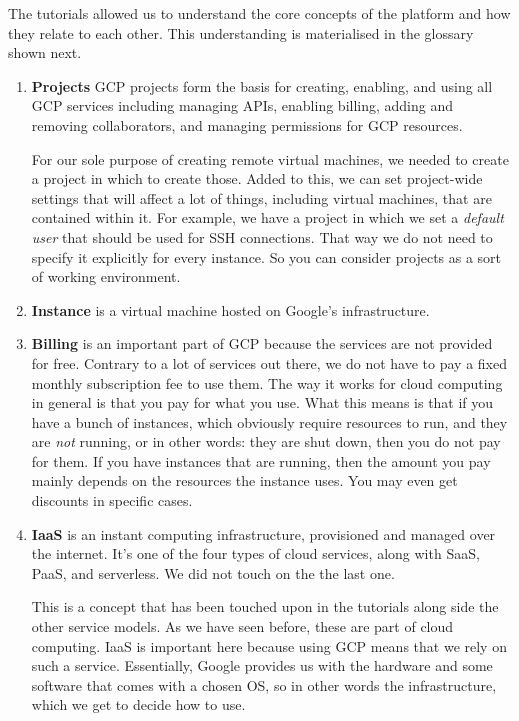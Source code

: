 The tutorials allowed us to understand the core concepts of the
platform and how they relate to each other. This understanding is
materialised in the glossary shown next.

\begin{enumerate}

	\item \textbf{Projects} GCP projects form the basis for creating,
	enabling, and using all GCP services including managing APIs,
	enabling billing, adding and removing collaborators, and managing
	permissions for GCP resources.\cite{GCP-project}
	
	For our sole purpose of creating remote virtual machines, we
	needed to create a project in which to create those.  Added to
	this, we can set project-wide settings that will affect a lot of
	things, including virtual machines, that are contained within it.
	For example, we have a project in which we set a \textit{default
	user} that should be used for SSH connections.  That way we do not
	need to specify it explicitly for every instance. So you can
	consider projects as a sort of working environment.

	\item \textbf{Instance} is a virtual machine hosted on
	Google's infrastructure.\cite{GCP-instance}

	\item \textbf{Billing} is an important part of GCP because the
	services are not provided for free. Contrary to a lot of services
	out there, we do not have to pay a fixed monthly subscription fee
	to use them. The way it works for cloud computing in general is
	that you pay for what you use. What this means is that if you have
	a bunch of instances, which obviously require resources to run,
	and they are \emph{not} running, or in other words: they are shut
	down, then you do not pay for them. If you have instances that are
	running, then the amount you pay mainly depends on the resources
	the instance uses. You may even get discounts in specific cases. 

	\item \textbf{IaaS} is an instant computing infrastructure,
	provisioned and managed over the internet. It’s one of the four
	types of cloud services, along with SaaS, PaaS, and
	serverless.\cite{IAAS} We did not touch on the the last one.
	
	This is a concept that has been touched upon in the
	tutorials along side the other service models. As we have seen
	before, these are part of cloud computing. IaaS is important here
	because using GCP means that we rely on such a service.
	Essentially, Google provides us with the hardware and some
	software that comes with a chosen OS, so in other words the
	infrastructure, which we get to decide how to use.
	 
\end{enumerate}
